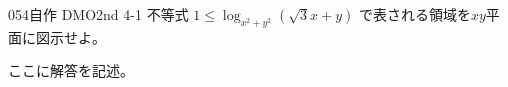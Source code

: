 \begin{prob}{054}{}{自作 DMO2nd 4-1}
 不等式 $1\le \log_{x^2+y^2}(\sqrt{3}x+y)$ で表される領域を$xy$平面に図示せよ。
\end{prob}
ここに解答を記述。